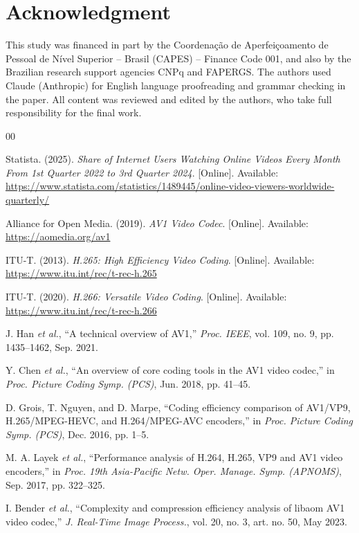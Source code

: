 \documentclass[conference]{IEEEtran}
\begin{document}
\section*{Acknowledgment}

This study was financed in part by the Coordena\c{c}\~ao de Aperfei\c{c}oamento de
Pessoal de N\'ivel Superior -- Brasil (CAPES) -- Finance Code 001, and also by the
Brazilian research support agencies CNPq and FAPERGS. The authors used Claude
(Anthropic) for English language proofreading and grammar checking in the
paper. All content was reviewed and edited by the authors, who take full
responsibility for the final work.

\begin{thebibliography}{00}

 Statista. (2025). \emph{Share of Internet Users Watching Online Videos Every Month From 1st Quarter 2022 to 3rd Quarter 2024}. [Online]. Available: \url{https://www.statista.com/statistics/1489445/online-video-viewers-worldwide-quarterly/}

 Alliance for Open Media. (2019). \emph{AV1 Video Codec}. [Online]. Available: \url{https://aomedia.org/av1}

 ITU-T. (2013). \emph{H.265: High Efficiency Video Coding}. [Online]. Available: \url{https://www.itu.int/rec/t-rec-h.265}

 ITU-T. (2020). \emph{H.266: Versatile Video Coding}. [Online]. Available: \url{https://www.itu.int/rec/t-rec-h.266}

 J. Han \emph{et al.}, ``A technical overview of AV1,'' \emph{Proc. IEEE}, vol. 109, no. 9, pp. 1435--1462, Sep. 2021.

 Y. Chen \emph{et al.}, ``An overview of core coding tools in the AV1 video codec,'' in \emph{Proc. Picture Coding Symp. (PCS)}, Jun. 2018, pp. 41--45.

 D. Grois, T. Nguyen, and D. Marpe, ``Coding efficiency comparison of AV1/VP9, H.265/MPEG-HEVC, and H.264/MPEG-AVC encoders,'' in \emph{Proc. Picture Coding Symp. (PCS)}, Dec. 2016, pp. 1--5.

 M. A. Layek \emph{et al.}, ``Performance analysis of H.264, H.265, VP9 and AV1 video encoders,'' in \emph{Proc. 19th Asia-Pacific Netw. Oper. Manage. Symp. (APNOMS)}, Sep. 2017, pp. 322--325.

 I. Bender \emph{et al.}, ``Complexity and compression efficiency analysis of libaom AV1 video codec,'' \emph{J. Real-Time Image Process.}, vol. 20, no. 3, art. no. 50, May 2023.


\end{thebibliography}
\end{document}
